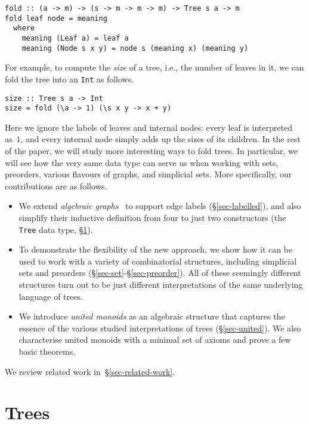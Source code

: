 \documentclass[crc,english]{programming}
\newcommand{\code}[1]{\lstinline[mathescape]|#1|}
\begin{document}
\begin{lstlisting}
fold :: (a -> m) -> (s -> m -> m -> m) -> Tree s a -> m
fold leaf node = meaning
  where
    meaning (Leaf a) = leaf a
    meaning (Node s x y) = node s (meaning x) (meaning y)
\end{lstlisting}

\noindent
For example, to compute the \emph{size} of a tree, i.e., the number of leaves in
it, we can fold the tree into an \code{Int} as follows.

\begin{lstlisting}
size :: Tree s a -> Int
size = fold (\a -> 1) (\s x y -> x + y)
\end{lstlisting}

\noindent
Here we ignore the labels of leaves and internal nodes: every leaf is
interpreted as~$1$, and every internal node simply adds up the sizes of its
children. In the rest of the paper, we will study more interesting ways to fold
trees. In particular, we will see how the very same data type can serve us when
working with sets, preorders, various flavours of graphs, and simplicial sets.
More specifically, our contributions are as follows.

\begin{itemize}
  \item We extend \emph{algebraic graphs}~\cite{mokhov_alga} to support edge
  labels (\S\ref{sec-labelled}), and also simplify their inductive definition
  from four to just two constructors (the \code{Tree} data type,
  \S\ref{sec-tree}).

  \item To demonstrate the flexibility of the new approach, we show how it can
  be used to work with a variety of combinatorial structures, including
  simplicial sets and preorders (\S\ref{sec-set}-\S\ref{sec-preorder}). All of
  these seemingly different structures turn out to be just different
  interpretations of the same underlying language of trees.

  \item We introduce \emph{united monoids} as an algebraic structure that
  captures the essence of the various studied interpretations of trees
  (\S\ref{sec-united}). We also characterise united monoids with a minimal set
  of axioms and prove a few basic theorems.
\end{itemize}

\noindent
We review related work in~\S\ref{sec-related-work}.

\section{Trees}\label{sec-tree}
\end{document}

